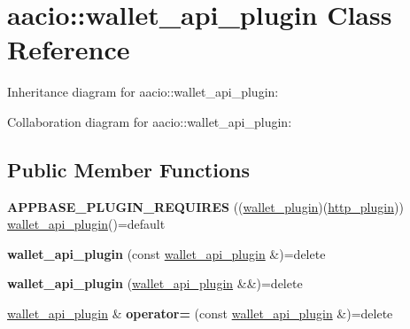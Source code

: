 \hypertarget{classaacio_1_1wallet__api__plugin}{}\section{aacio\+:\+:wallet\+\_\+api\+\_\+plugin Class Reference}
\label{classaacio_1_1wallet__api__plugin}


Inheritance diagram for aacio\+:\+:wallet\+\_\+api\+\_\+plugin\+:


Collaboration diagram for aacio\+:\+:wallet\+\_\+api\+\_\+plugin\+:
\subsection*{Public Member Functions}
\begin{DoxyCompactItemize}
\item 
\mbox{\label{classaacio_1_1wallet__api__plugin_a5b5e4335f533d459d7c0ee31f8a288d6}} 
{\bfseries A\+P\+P\+B\+A\+S\+E\+\_\+\+P\+L\+U\+G\+I\+N\+\_\+\+R\+E\+Q\+U\+I\+R\+ES} ((\mbox{\hyperlink{classaacio_1_1wallet__plugin}{wallet\+\_\+plugin}})(\mbox{\hyperlink{classaacio_1_1http__plugin}{http\+\_\+plugin}})) \mbox{\hyperlink{classaacio_1_1wallet__api__plugin}{wallet\+\_\+api\+\_\+plugin}}()=default
\item 
\mbox{\label{classaacio_1_1wallet__api__plugin_af17df146accfcc8679f81f7b3a1c0a63}} 
{\bfseries wallet\+\_\+api\+\_\+plugin} (const \mbox{\hyperlink{classaacio_1_1wallet__api__plugin}{wallet\+\_\+api\+\_\+plugin}} \&)=delete
\item 
\mbox{\label{classaacio_1_1wallet__api__plugin_ad3315a4d22a5c376cd662819b4120de2}} 
{\bfseries wallet\+\_\+api\+\_\+plugin} (\mbox{\hyperlink{classaacio_1_1wallet__api__plugin}{wallet\+\_\+api\+\_\+plugin}} \&\&)=delete
\item 
\mbox{\label{classaacio_1_1wallet__api__plugin_af09dd9d40e3d24ef2252addeb895f42f}} 
\mbox{\hyperlink{classaacio_1_1wallet__api__plugin}{wallet\+\_\+api\+\_\+plugin}} \& {\bfseries operator=} (const \mbox{\hyperlink{classaacio_1_1wallet__api__plugin}{wallet\+\_\+api\+\_\+plugin}} \&)=delete
\item 
\mbox{\label{classaacio_1_1wallet__api__plugin_ac74957ae17bfe93f88810756b4989be2}} 

\end{DoxyCompactItemize}
